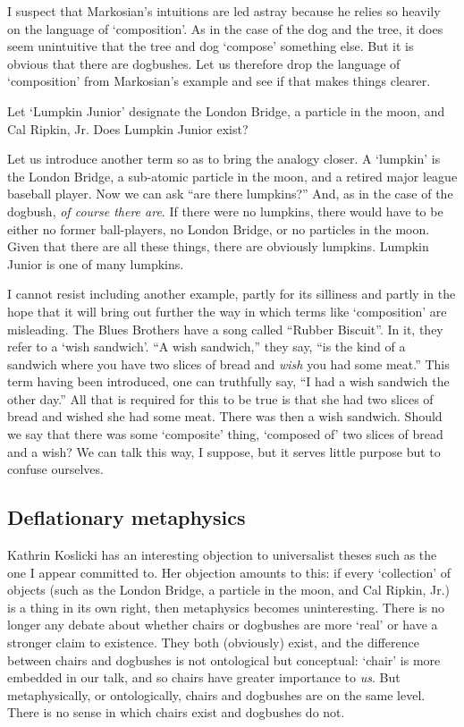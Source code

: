 \documentclass[11pt]{article}
\begin{document}
\begin{spacing}{1.25}
I suspect that Markosian's intuitions are led astray because he relies
so heavily on the language of `composition'.  As in the case of the
dog and the tree, it does seem unintuitive that the tree and dog
`compose' something else.  But it is obvious that there are
dogbushes.  Let us therefore drop the language of `composition' from
Markosian's example and see if that makes things clearer.

Let `Lumpkin Junior' designate the London Bridge, a particle in the
moon, and Cal Ripkin, Jr.  Does Lumpkin Junior exist?

Let us introduce another term so as to bring the analogy closer.  A
`lumpkin' is the London Bridge, a sub-atomic particle in the moon, and
a retired major league baseball player.  Now we can ask ``are there
lumpkins?''  And, as in the case of the dogbush, {\em of course there
  are}.  If there were no lumpkins, there would have to be either no
former ball-players, no London Bridge, or no particles in the moon.
Given that there are all these things, there are obviously lumpkins.
Lumpkin Junior is one of many lumpkins.

I cannot resist including another example, partly for its silliness
and partly in the hope that it will bring out further the way in which
terms like `composition' are misleading.  The Blues Brothers have a
song called ``Rubber Biscuit''.  In it, they refer to a `wish
sandwich'.  ``A wish sandwich,'' they say, ``is the kind of a sandwich
where you have two slices of bread and {\em wish} you had some meat.''
This term having been introduced, one can truthfully say, ``I had a
wish sandwich the other day.''  All that is required for this to be
true is that she had two slices of bread and wished she had some meat.
There was then a wish sandwich.  Should we say that there was some
`composite' thing, `composed of' two slices of bread and a wish?  We
can talk this way, I suppose, but it serves little purpose but to
confuse ourselves.

\subsection{Deflationary metaphysics}
\label{deflate}
Kathrin Koslicki has an interesting objection to universalist theses
such as the one I appear committed to.  Her objection amounts to this:
if every `collection' of objects (such as the London Bridge, a
particle in the moon, and Cal Ripkin, Jr.) is a thing in its own
right, then metaphysics becomes uninteresting.  There is no longer any
debate about whether chairs or dogbushes are more `real' or have a
stronger claim to existence.  They both (obviously) exist, and the
difference between chairs and dogbushes is not ontological but
conceptual: `chair' is more embedded in our talk, and so chairs have
greater importance to {\em us}.  But metaphysically, or ontologically,
chairs and dogbushes are on the same level.  There is no sense in
which chairs exist and dogbushes do not.


\end{spacing}
\end{document}
